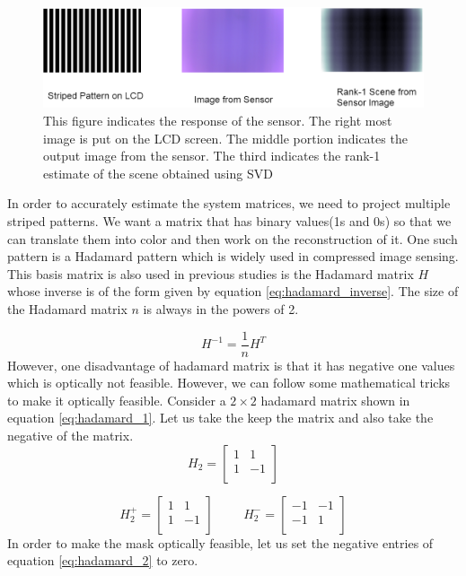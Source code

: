 \begin{figure}[h]
\centering
\includegraphics[width = \linewidth]{pics/Striped_Pattern_Response.png}
\caption{This figure indicates the response of the sensor. The right most image is put on the LCD screen. The middle portion indicates the output image from the sensor. The third indicates the rank-1 estimate of the scene obtained using SVD}
\label{fig:str_response}
\end{figure}

In order to accurately estimate the system matrices, we need to project multiple striped patterns. 
We want a matrix that has binary values(1s and 0s) so that we can translate them into color and then work on the reconstruction of it. One such pattern is a Hadamard pattern which is widely used in compressed image sensing\cite{hadamard}\cite{Flatcam}. This basis matrix is also used in previous studies is the Hadamard matrix $H$ whose inverse is of the form given by equation \ref{eq:hadamard_inverse}. The size of the Hadamard matrix $n$ is always in the powers of 2.

\begin{equation}
H^{-1} = \frac{1}{n} H^T
\label{eq:hadamard_inverse}
\end{equation}
However, one disadvantage of hadamard matrix is that it has negative one values which is optically not feasible. However, we can follow some mathematical tricks to make it optically feasible. Consider a $2 \times 2$ hadamard matrix shown in equation \ref{eq:hadamard_1}. Let us take the keep the matrix and also take the negative of the matrix.
\begin{equation}
H_2 = \begin{bmatrix} 
       1 & 1 \\
       1 & -1 \\
    \end{bmatrix}
    \label{eq:hadamard_1}
\end{equation}

\begin{equation}
H_2^+ = \begin{bmatrix} 
       1 & 1 \\
       1 & -1 \\
    \end{bmatrix}
   \hspace{1cm}
   H_2^- = \begin{bmatrix} 
       -1 & -1 \\
       -1 & 1 \\
    \end{bmatrix}
    \label{eq:hadamard_2}
\end{equation}
In order to make the mask optically feasible, let us set the negative entries of equation \ref{eq:hadamard_2} to zero.

